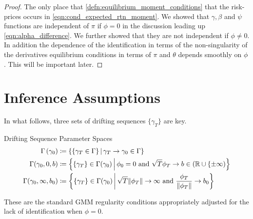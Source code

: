 \documentclass[11pt, letterpaper, twoside, final]{article}
\begin{document}
\begin{appendices}
\begin{proof}
  The only place that \cref{defn:equilibrium_moment_conditions} that the risk-prices occurs in
  \cref{eqn:cond_expected_rtn_moment}. 
  We showed that $\gamma, \beta$ and $\psi$ functions are independent of $\pi$ if $\phi = 0$ in the discussion
  leading up \cref{eqn:alpha_difference}.
  We further showed that they are not independent if $\phi \neq 0$.
  In addition the dependence of the identification in terms of the non-singularity of the derivatives
  equilibrium conditions in terms of $\pi$ and $\theta$ depends smoothly on $\phi$. 
  This will be important later.
  
\end{proof}

\section{Inference Assumptions}

  In what follows, three sets of drifting sequences $\lbrace \gamma_T \rbrace$ are key. 
  
  \begin{defn}{Drifting Sequence Parameter Spaces}
    \begin{align}
      \Gamma\left(\gamma_0\right) &\coloneqq \left\lbrace \left\lbrace \gamma_T \in \Gamma \right\rbrace
      \mvert \gamma_T \to \gamma_0 \in \Gamma \right\rbrace\\ 
      \Gamma(\gamma_0, 0, b) &\coloneqq \left\lbrace \lbrace \gamma_T \rbrace \in \Gamma(\gamma_0) \mvert
      \phi_0 = 0\ \text{and}\ \sqrt{T} \phi_T \to b \in (\R \cup \lbrace \pm \infty) \right\rbrace \\
      \Gamma(\gamma_0, \infty, b_0) &\coloneqq \left\lbrace \lbrace \gamma_T \rbrace \in \Gamma (\gamma_0)
      \mvert \sqrt{T} \norm{\phi_T} \to \infty\ \text{and}\ \frac{\phi_T}{\norm{\phi_T}} \to b_0
      \right\rbrace 
    \end{align}
  \end{defn}
  
  These are the standard GMM regularity conditions appropriately adjusted for the lack of identification when
  $\phi =0$.
  

\end{appendices}
\end{document}
